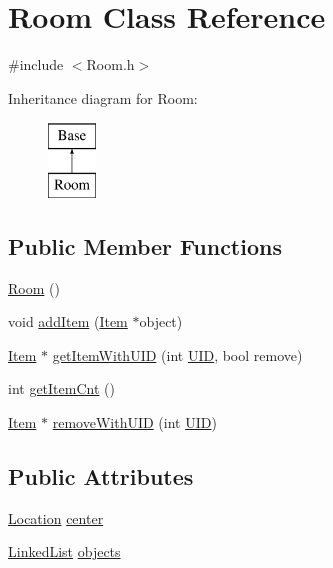 \hypertarget{classRoom}{\section{Room Class Reference}
\label{classRoom}
}


{\ttfamily \#include $<$Room.\-h$>$}

Inheritance diagram for Room\-:\begin{figure}[H]
\begin{center}
\leavevmode
\includegraphics[height=2.000000cm]{classRoom}
\end{center}
\end{figure}
\subsection*{Public Member Functions}
\begin{DoxyCompactItemize}
\item 
\hyperlink{classRoom_ac6ef93a7d9c3e1d624e025058d5f16ff}{Room} ()
\item 
void \hyperlink{classRoom_af96fc605a002ba3d936a593bffed5d66}{add\-Item} (\hyperlink{classItem}{Item} $\ast$object)
\item 
\hyperlink{classItem}{Item} $\ast$ \hyperlink{classRoom_a3f3d6443a0050a9558bc9445012a2fc3}{get\-Item\-With\-U\-I\-D} (int \hyperlink{classBase_ac25c86b1d7bb8304fc0a81b8bddf7faf}{U\-I\-D}, bool remove)
\item 
int \hyperlink{classRoom_a1b59f0d10039c8f2683ecab81320887b}{get\-Item\-Cnt} ()
\item 
\hyperlink{classItem}{Item} $\ast$ \hyperlink{classRoom_a83a1e3f11cbe4ff4914bee88e920814e}{remove\-With\-U\-I\-D} (int \hyperlink{classBase_ac25c86b1d7bb8304fc0a81b8bddf7faf}{U\-I\-D})
\end{DoxyCompactItemize}
\subsection*{Public Attributes}
\begin{DoxyCompactItemize}
\item 
\hyperlink{structLocation}{Location} \hyperlink{classRoom_a160f390cd743ed1287815a41221a448b}{center}
\item 
\hyperlink{classLinkedList}{Linked\-List} \hyperlink{classRoom_a8e642143950831f3b9aa1faefff15b36}{objects}
\end{DoxyCompactItemize}



